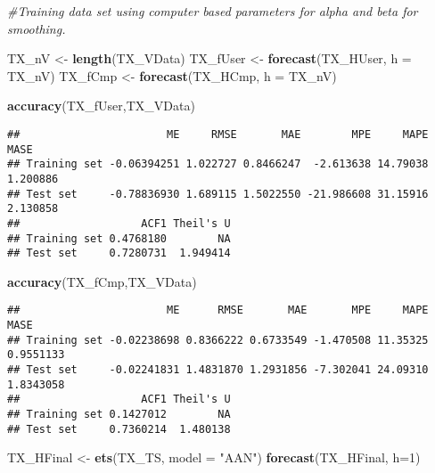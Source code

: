 \documentclass[
]{article}
\newenvironment{Shaded}{\begin{snugshade}}{\end{snugshade}}
\newcommand{\CommentTok}[1]{\textcolor[rgb]{0.56,0.35,0.01}{\textit{#1}}}
\newcommand{\DataTypeTok}[1]{\textcolor[rgb]{0.13,0.29,0.53}{#1}}
\newcommand{\DecValTok}[1]{\textcolor[rgb]{0.00,0.00,0.81}{#1}}
\newcommand{\KeywordTok}[1]{\textcolor[rgb]{0.13,0.29,0.53}{\textbf{#1}}}
\newcommand{\NormalTok}[1]{#1}
\newcommand{\StringTok}[1]{\textcolor[rgb]{0.31,0.60,0.02}{#1}}
\begin{document}
\begin{Shaded}
\begin{Highlighting}[]
\CommentTok{#Training data set using computer based parameters for alpha and beta for smoothing.}
\end{Highlighting}
\end{Shaded}

\begin{Shaded}
\begin{Highlighting}[]
\NormalTok{TX_nV <-}\StringTok{ }\KeywordTok{length}\NormalTok{(TX_VData)}
\NormalTok{TX_fUser <-}\StringTok{ }\KeywordTok{forecast}\NormalTok{(TX_HUser, }\DataTypeTok{h =}\NormalTok{ TX_nV)}
\NormalTok{TX_fCmp <-}\StringTok{ }\KeywordTok{forecast}\NormalTok{(TX_HCmp, }\DataTypeTok{h =}\NormalTok{ TX_nV)}
\end{Highlighting}
\end{Shaded}

\begin{Shaded}
\begin{Highlighting}[]
\KeywordTok{accuracy}\NormalTok{(TX_fUser,TX_VData)}
\end{Highlighting}
\end{Shaded}

\begin{verbatim}
##                       ME     RMSE       MAE        MPE     MAPE     MASE
## Training set -0.06394251 1.022727 0.8466247  -2.613638 14.79038 1.200886
## Test set     -0.78836930 1.689115 1.5022550 -21.986608 31.15916 2.130858
##                   ACF1 Theil's U
## Training set 0.4768180        NA
## Test set     0.7280731  1.949414
\end{verbatim}

\begin{Shaded}
\begin{Highlighting}[]
\KeywordTok{accuracy}\NormalTok{(TX_fCmp,TX_VData)}
\end{Highlighting}
\end{Shaded}

\begin{verbatim}
##                       ME      RMSE       MAE       MPE     MAPE      MASE
## Training set -0.02238698 0.8366222 0.6733549 -1.470508 11.35325 0.9551133
## Test set     -0.02241831 1.4831870 1.2931856 -7.302041 24.09310 1.8343058
##                   ACF1 Theil's U
## Training set 0.1427012        NA
## Test set     0.7360214  1.480138
\end{verbatim}

\begin{Shaded}
\begin{Highlighting}[]
\NormalTok{TX_HFinal <-}\StringTok{ }\KeywordTok{ets}\NormalTok{(TX_TS, }\DataTypeTok{model =} \StringTok{"AAN"}\NormalTok{)}
\KeywordTok{forecast}\NormalTok{(TX_HFinal, }\DataTypeTok{h=}\DecValTok{1}\NormalTok{)}
\end{Highlighting}
\end{Shaded}
\end{document}
